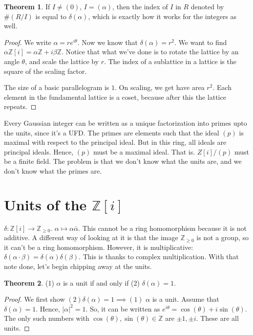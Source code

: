 \documentclass{book}
\newcommand{\Z}{\ensuremath{\mathbb{Z}}}
\theoremstyle{definition}
\newtheorem{theorem}{Theorem}
\begin{document}
\begin{theorem}
If $I \neq (0)$, $I = (\alpha)$, then the index of $I$ in $R$ denoted by
$\#(R/I)$ is equal to $\delta(\alpha)$,
which is exactly how it works for the integers as well.
\end{theorem}
\begin{proof}
We write $\alpha = re^{i \theta}$. Now we know that $\delta(\alpha) = r^2$.
We want to find $\alpha \Z[i] = \alpha \Z + i \beta \Z$. Notice that
what we've done is to rotate the lattice by an angle $\theta$, and scale the lattice by $r$.
The index of a sublattice in a lattice is the square of the scaling factor. 

The size of a basic parallelogram is $1$. On scaling, we get have area $r^2$.
Each element in the fundamental lattice is a coset, because after this
the lattice repeats.
\end{proof}

Every Gaussian integer can be written as a unique factorization into primes
upto the units, since it's a UFD. The primes are elements such that the ideal $(p)$ is maximal
with respect to the principal ideal. But in this ring, all ideals are principal
ideals. Hence, $(p)$ must be a maximal ideal. That is. $Z[i]/(p)$ must be
a finite field. The problem is that we don't know what the units are, and we don't
know what the primes are. 

\section{Units of the $\Z[i]$}
$\delta: \Z[i] \rightarrow \Z_{\geq 0}$. $\alpha \mapsto \alpha \bar \alpha$. This cannot
be a ring homomorphism because it is not additive. A different way of looking
at it is that the image $\Z_{\geq 0}$ is not a group, so it can't be
a ring homomorphism. However, it is multiplicative: $\delta(\alpha \cdot \beta) = \delta(\alpha) \delta(\beta)$.
This is thanks to complex multiplication. With that note done,
let's begin chipping away at the units.

\begin{theorem}
(1) $\alpha$ is a unit if and only if (2) $\delta(\alpha) = 1$.
\end{theorem}
\begin{proof}
We first show $(2) \delta(\alpha) = 1 \implies (1)$ $\alpha$ is a unit.
Assume that $\delta(\alpha) = 1$. Hence, $|\alpha|^2 = 1$.
So, it can be written as $e^{i \theta} = \cos(\theta) + i \sin(\theta)$. The only
such numbers with  $\cos(\theta), \sin(\theta) \in \Z$ are $\pm 1, \pm i$. 
These are all units. 
\end{proof}
\end{document}
